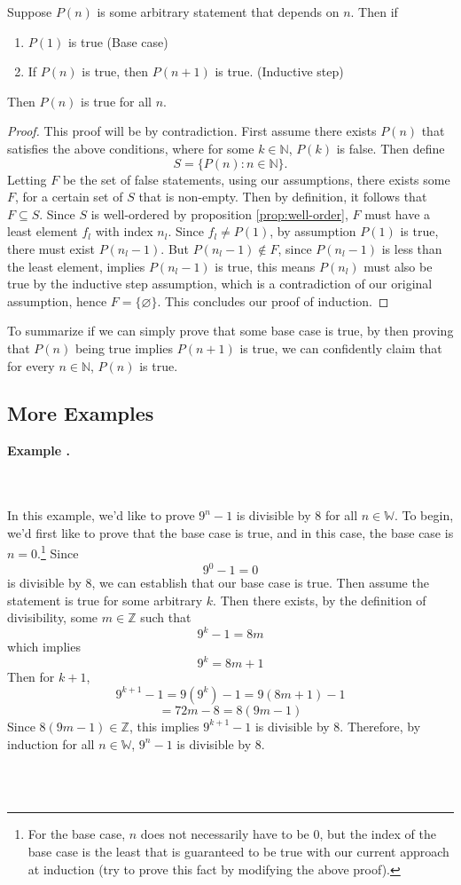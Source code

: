 \documentclass[11pt]{article}
\numberwithin{lemma}{section}
\numberwithin{equation}{section}
\numberwithin{define}{section}
\numberwithin{prop}{section}
\numberwithin{figure}{section}
\numberwithin{theorem}{section}
\newcounter{ex}[section]
\newenvironment{ex}[0]{

	\refstepcounter{ex}
	\begin{large}
    \textbf{Example \theex .}
    \end{large}\\\\
    }
    {
    \\\\
    }
\numberwithin{ex}{section}
\def\nat{\mathbb{N}}
\def\integ{\mathbb{Z}}
\begin{document}
\begin{theorem}[Induction]
	Suppose $P(n)$ is some arbitrary statement that depends on $n$. Then if
	\begin{enumerate}
		\item $P(1)$ is true (Base case)
		\item If $P(n)$ is true, then $P(n+1)$ is true. (Inductive step)
	\end{enumerate}
	Then $P(n)$ is true for all $n$.
\end{theorem}
\begin{proof}
	This proof will be by contradiction. First assume there exists $P(n)$ that satisfies the above conditions, where for some $k\in\nat$, $P(k)$ is false. 
	Then define 
	$$S=\{P(n):n\in\nat\}.$$
	Letting $F$ be the set of false statements, using our assumptions, there exists some $F$, for a certain set of $S$ that is non-empty. 
	Then by definition, it follows that $F\subseteq S$. Since $S$ is well-ordered by proposition \eqref{prop:well-order}, $F$ must have a least element $f_l$ with index $n_l$. 
	Since $f_l\neq P(1)$, by assumption $P(1)$ is true, there must exist $P(n_l-1)$. 
	But $P(n_l-1)\notin F$, since $P(n_l-1)$ is less than the least element, implies $P(n_l-1)$ is true, this means $P(n_l)$ must also be true by the inductive step assumption, which is a contradiction of our original assumption, hence $F=\{\varnothing\}$. 
	This concludes our proof of induction.
\end{proof}

To summarize if we can simply prove that some base case is true, by then proving that $P(n)$ being true implies $P(n+1)$ is true, we can confidently claim that for every $n\in\nat$, $P(n)$ is true.
\subsection{More Examples}
\begin{ex}
	In this example, we'd like to prove $9^n-1$ is divisible by $8$ for all $n\in\mathbb{W}$. 
	To begin, we'd first like to prove that the base case is true, and in this case, the base case is $n=0$.\footnote{For the base case, $n$ does not necessarily have to be 0, but the index of the base case is the least that is guaranteed to be true with our current approach at induction (try to prove this fact by modifying the above proof).} Since
	$$9^0-1=0$$
	is divisible by 8, we can establish that our base case is true. Then assume the statement is true for some arbitrary $k$. Then there exists, by the definition of divisibility, some $m\in\integ$ such that
	$$9^k-1=8m$$
	which implies
	$$9^k=8m+1$$
	Then for $k+1$,
	$$9^{k+1}-1=9(9^k)-1=9(8m+1)-1$$
	$$=72m-8=8(9m-1)$$
	Since $8(9m-1)\in\integ$, this implies $9^{k+1}-1$ is divisible by 8. Therefore, by induction for all $n\in\mathbb{W}$, $9^n-1$ is divisible by 8.
\end{ex}
\end{document}
